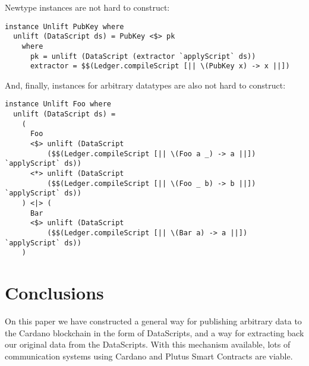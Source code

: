 \documentclass{article}
\begin{document}
Newtype instances are not hard to construct:
\nopagebreak

\begin{verbatim}
instance Unlift PubKey where
  unlift (DataScript ds) = PubKey <$> pk
    where
      pk = unlift (DataScript (extractor `applyScript` ds))
      extractor = $$(Ledger.compileScript [|| \(PubKey x) -> x ||])
\end{verbatim}

And, finally, instances for arbitrary datatypes are also not hard to construct:
\nopagebreak

\begin{verbatim}
instance Unlift Foo where
  unlift (DataScript ds) =
    (
      Foo
      <$> unlift (DataScript
          ($$(Ledger.compileScript [|| \(Foo a _) -> a ||]) `applyScript` ds))
      <*> unlift (DataScript
          ($$(Ledger.compileScript [|| \(Foo _ b) -> b ||]) `applyScript` ds))
    ) <|> (
      Bar
      <$> unlift (DataScript
          ($$(Ledger.compileScript [|| \(Bar a) -> a ||]) `applyScript` ds))
    )
\end{verbatim}

\section{Conclusions}

On this paper we have constructed a general way for publishing arbitrary data to the Cardano blockchain in the form of DataScripts, and a way for extracting back our original data from the DataScripts. With this mechanism available, lots of communication systems using Cardano and Plutus Smart Contracts are viable.
\end{document}
